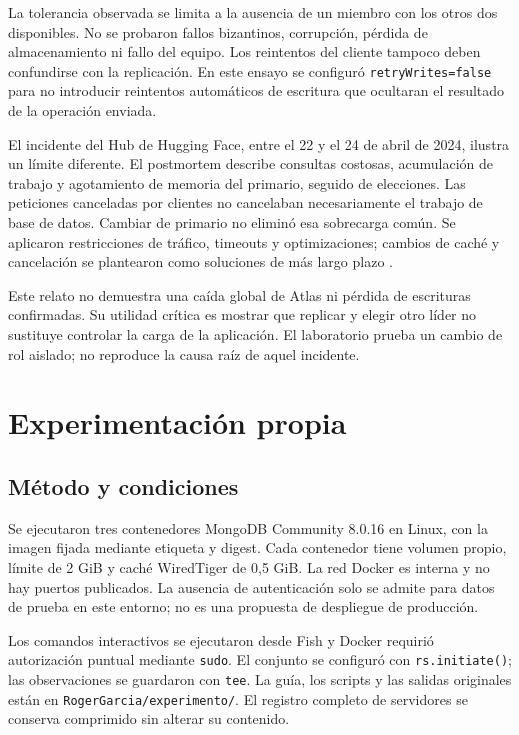 La tolerancia observada se limita a la ausencia de un miembro con los otros dos disponibles. No se probaron fallos bizantinos, corrupción, pérdida de almacenamiento ni fallo del equipo. Los reintentos del cliente tampoco deben confundirse con la replicación. En este ensayo se configuró \texttt{retryWrites=false} para no introducir reintentos automáticos de escritura que ocultaran el resultado de la operación enviada.

El incidente del Hub de Hugging Face, entre el 22 y el 24 de abril de 2024, ilustra un límite diferente. El postmortem describe consultas costosas, acumulación de trabajo y agotamiento de memoria del primario, seguido de elecciones. Las peticiones canceladas por clientes no cancelaban necesariamente el trabajo de base de datos. Cambiar de primario no eliminó esa sobrecarga común. Se aplicaron restricciones de tráfico, timeouts y optimizaciones; cambios de caché y cancelación se plantearon como soluciones de más largo plazo \cite{Georges2024}.

Este relato no demuestra una caída global de Atlas ni pérdida de escrituras confirmadas. Su utilidad crítica es mostrar que replicar y elegir otro líder no sustituye controlar la carga de la aplicación. El laboratorio prueba un cambio de rol aislado; no reproduce la causa raíz de aquel incidente.

\section{Experimentación propia}
\subsection{Método y condiciones}
Se ejecutaron tres contenedores MongoDB Community 8.0.16 en Linux, con la imagen fijada mediante etiqueta y digest. Cada contenedor tiene volumen propio, límite de 2 GiB y caché WiredTiger de 0,5 GiB. La red Docker es interna y no hay puertos publicados. La ausencia de autenticación solo se admite para datos de prueba en este entorno; no es una propuesta de despliegue de producción.

Los comandos interactivos se ejecutaron desde Fish y Docker requirió autorización puntual mediante \texttt{sudo}. El conjunto se configuró con \texttt{rs.initiate()}; las observaciones se guardaron con \texttt{tee}. La guía, los scripts y las salidas originales están en \texttt{RogerGarcia/experimento/}. El registro completo de servidores se conserva comprimido sin alterar su contenido.

